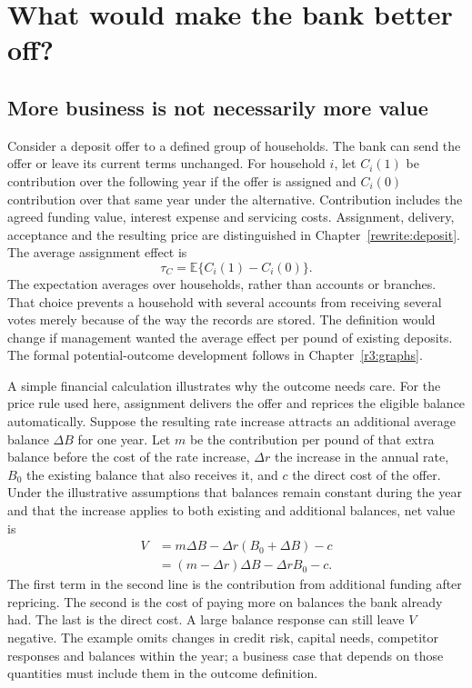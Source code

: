 \chapter{What would make the bank better off?}
\label{reading:banking-decision}

\section{More business is not necessarily more value}

Consider a deposit offer to a defined group of households. The bank can send
the offer or leave its current terms unchanged. For household $i$, let
$C_i(1)$ be contribution over the following year if the offer is assigned and
$C_i(0)$ contribution over that same year under the alternative. Contribution
includes the agreed funding value, interest expense and servicing costs.
Assignment, delivery, acceptance and the resulting price are distinguished
in Chapter~\ref{rewrite:deposit}. The average assignment effect is
\[
 \tau_C=\mathbb E\{C_i(1)-C_i(0)\}.
\]
The expectation averages over households, rather than accounts or branches.
That choice prevents a household with several accounts from receiving several
votes merely because of the way the records are stored. The definition would
change if management wanted the average effect per pound of existing deposits.
The formal potential-outcome development follows in Chapter~\ref{r3:graphs}.

A simple financial calculation illustrates why the outcome needs care. For the price rule used here, assignment delivers the offer and reprices
the eligible balance automatically. Suppose the resulting rate increase
attracts an additional average balance $\Delta B$ for one year. Let
$m$ be the contribution per pound of that extra balance before the cost of the
rate increase, $\Delta r$ the increase in the annual rate, $B_0$ the existing
balance that also receives it, and $c$ the direct cost of the offer. Under the
illustrative assumptions that balances remain constant during the year and
that the increase applies to both existing and additional balances, net value is
\begin{align}
 V&=m\Delta B-\Delta r(B_0+\Delta B)-c\\
  &=(m-\Delta r)\Delta B-\Delta r B_0-c.
 \label{reading:deposit-value}
\end{align}
The first term in the second line is the contribution from additional funding
after repricing. The second is the cost of paying more on balances the bank
already had. The last is the direct cost. A large balance response can still
leave $V$ negative. The example omits changes in credit risk, capital needs,
competitor responses and balances within the year; a business case that depends
on those quantities must include them in the outcome definition.

